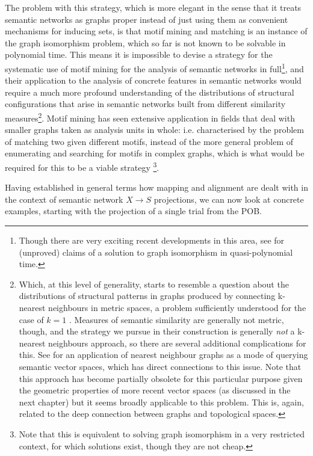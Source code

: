 The problem with this strategy, which is more elegant in the sense that it treats semantic networks as graphs proper instead of just using them as convenient mechanisms for inducing sets, is that motif mining and matching is an instance of the graph isomorphism problem, which so far is not known to be solvable in polynomial time.
This means it is impossible to devise a strategy for the systematic use of motif mining for the analysis of semantic networks in full\footnote{
    Though there are very exciting recent developments in this area, see \citet{babai2015} for (unproved) claims of a solution to graph isomorphism in quasi-polynomial time.
},  and their application to the analysis of concrete features in semantic networks would require a much more profound understanding of the distributions of structural configurations that arise in semantic networks built from different similarity measures\footnote{
    \label{foot:knn_graphs}
    Which, at this level of generality, starts to resemble a question about the distributions of structural patterns in graphs produced by connecting k-nearest neighbours in metric spaces, a problem sufficiently understood for the case of $k=1$ \citep{eppstein1997}.
    Measures of semantic similarity are generally not metric, though, and the strategy we pursue in their construction is generally \emph{not} a k-nearest neighbours approach, so there are several additional complications for this.
    See \citet{karlgren2008,gyllensten2015} for an application of nearest neighbour graphs as a mode of querying semantic vector spaces, which has direct connections to this issue.
    Note that this approach has become partially obsolete for this particular purpose given the geometric properties of more recent vector spaces (as discussed in the next chapter) but it seems broadly applicable to this problem.
    This is, again, related to the deep connection between graphs and topological spaces.
}.
Motif mining has seen extensive application in fields that deal with smaller graphs taken as analysis units in whole: i.e. characterised by the problem of matching two given different motifs, instead of the more general problem of enumerating and searching for motifs in complex graphs, which is what would be required for this to be a viable strategy \citep{milo2002,dunne2013,wang2014a,wei2017}\footnote{
    Note that this is equivalent to solving graph isomorphism in a very restricted context, for which solutions exist, though they are not cheap.
}.

Having established in general terms how mapping and alignment are dealt with in the context of semantic network $X \rightarrow S$ projections, we can now look at concrete examples, starting with the projection of a single trial from the POB.

